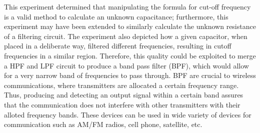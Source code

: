 \documentclass[journal]{IEEEtran}
\begin{document}
\noindent This experiment determined that manipulating the formula for cut-off frequency is a valid method to calculate an unknown capacitance; furthermore, this experiment may have been extended to similarly calculate the unknown resistance of a filtering circuit. The experiment also depicted how a given capacitor, when placed in a deliberate way, filtered different frequencies, resulting in cutoff frequencies in a similar region. Therefore, this quality could be exploited to merge a HPF and LPF circuit to produce a band pass filter (BPF), which would allow for a very narrow band of frequencies to pass through. BPF are crucial to wireless communications, where transmitters are allocated a certain frequency range. Thus, producing and detecting an output signal within a certain band assures that the communication does not interfere with other transmitters with their alloted frequency bands. These devices can be used in wide variety of devices for communication such as AM/FM radios, cell phone, satellite, etc.






\printbibliography
\end{document}

